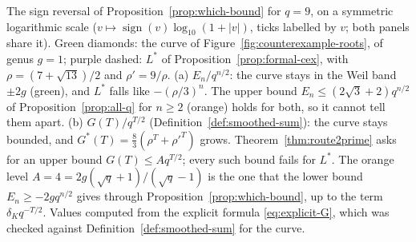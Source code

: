 \caption{The sign reversal of Proposition~\ref{prop:which-bound} for $q=9$,
on a symmetric logarithmic scale ($v\mapsto\operatorname{sign}(v)\log_{10}
(1+\lvert v\rvert)$, ticks labelled by $v$; both panels share it). Green
diamonds: the curve of Figure~\ref{fig:counterexample-roots}, of genus
$g=1$; purple dashed: $L^*$ of Proposition~\ref{prop:formal-cex}, with
$\rho=(7+\sqrt{13})/2$ and $\rho'=9/\rho$. (a) $E_n/q^{n/2}$: the curve
stays in the Weil band $\pm2g$ (green), and $L^*$ falls like
$-(\rho/3)^n$. The upper bound $E_n\le(2\sqrt3+2)q^{n/2}$ of
Proposition~\ref{prop:all-q} for $n\ge2$ (orange) holds for both, so it
cannot tell them apart. (b) $G(T)/q^{T/2}$
(Definition~\ref{def:smoothed-sum}): the curve stays bounded, and
$G^*(T)=\frac83(\rho^T+\rho'^T)$ grows. Theorem~\ref{thm:route2prime}
asks for an upper bound $G(T)\le Aq^{T/2}$; every such bound fails for
$L^*$. The orange level $A=4=2g(\sqrt q+1)/(\sqrt q-1)$ is the one that
the lower bound $E_n\ge-2gq^{n/2}$ gives through
Proposition~\ref{prop:which-bound}, up to the term $\delta_Kq^{-T/2}$.
Values computed from the explicit formula \eqref{eq:explicit-G}, which
was checked against Definition~\ref{def:smoothed-sum} for the curve.}
\label{fig:smoothed-sign}
